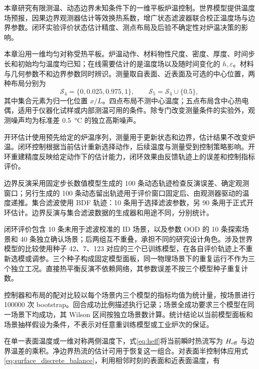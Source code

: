 
本章研究有限测温、动态边界未知条件下的一维平板炉温控制。世界模型提供温度场预报，因果边界观测器估计等效换热系数，增广状态滤波器联合校正温度场与边界参数。闭环实验评价状态估计精度、测点布局及后验不确定性对炉温决策的影响。


本章沿用一维均匀对称受热平板。炉温动作、材料物性尺度、密度、厚度、时间步长和初始均匀温度均已知；在线需要估计的是温度场以及随时间变化的 $h,\varepsilon$。材料与几何参数不和边界参数同时辨识。测量取自表面、近表面及可选的中心位置，两种布局分别为
\begin{equation}
  \mathcal{S}_4=\{0,0.025,0.975,1\},\qquad
  \mathcal{S}_5=\mathcal{S}_4\cup\{0.5\},
  \label{eq:sensor_layouts}
\end{equation}
其中集合元素为归一化位置 $x/L$。四点布局不测中心温度；五点布局含中心热电偶，适用于仪器化试样或内部测温可用的条件。除专门改变测量条件的实验外，观测噪声均为标准差 \SI{0.5}{\degreeCelsius} 的独立高斯噪声。

开环估计使用预先给定的炉温序列，测量用于更新状态和边界，估计结果不改变炉温。闭环控制根据当前估计重新选择动作，后续温度与测量受到控制策略影响。开环重建精度反映给定动作下的估计能力，闭环效果由反馈轨迹上的误差和控制指标评价。

边界反演采用固定步长数值模型生成的 100 条动态轨迹检查反演误差、确定观测窗口；另行生成的 100 条动态留出轨迹用于评价窗口固定后、由观测器驱动的温度递推。集合滤波使用 BDF 轨迹：10 条用于选择滤波参数，另 90 条用于正式开环估计。边界反演与集合滤波数据的生成器和用途不同，分别统计。

闭环评价包含 10 条未用于滤波校准的 ID 场景，以及参数 OOD 的 10 条探索场景和 40 条独立确认场景；后两组互不重叠，承担不同的研究设计角色。涉及世界模型的比较使用种子 42、7、123 对应的三个已训练模型，在各自评价轨迹上不重新选模或调参。三个种子构成固定模型面板，同一物理场景下的重复运行不作为三个独立工况。直接热平衡反演不依赖网络，其参数误差不按三个模型种子重复计数。

控制器和布局的配对比较以每个场景内三个模型的指标均值为统计量，按场景进行 100000 次 bootstrap。回合成功比例描述执行记录；场景全成功要求三个模型在同一场景下均成功，其 Wilson 区间按独立场景数计算。统计结论以当前模型面板和场景抽样假设为条件，不表示对任意重训练模型或工业炉次的保证。


在单一表面温度或一维对称两侧温度下，式\eqref{eq:heff}将当前瞬时热流写为 ${H_{\mathrm{eff}}}$ 与边界温差的乘积。净边界热流的估计可用于恢复这一组合。对表面半控制体应用式\eqref{eq:surface_discrete_balance}，利用相邻时刻的表面和近表面温度，有

